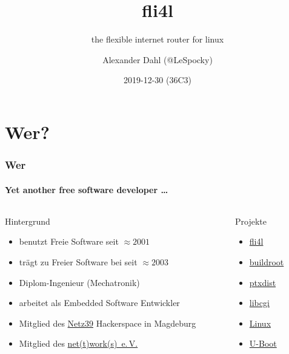 \documentclass[t]{beamer}
\title[fli4l]{fli4l}
\subtitle{the flexible internet router for linux}
\author{Alexander Dahl (@LeSpocky)}
\institute[fli4l.de]{\url{https://www.fli4l.de/}}
\date{2019-12-30 (36C3)}
\begin{document}
\begin{frame}
    \titlepage
\end{frame}


\section*{Wer?}

\begin{frame}
    \frametitle{Wer}
    \framesubtitle{Yet another free software developer \dots}

    \begin{columns}[T,onlytextwidth]
        \begin{column}{0.7\textwidth}
            \begin{block}{Hintergrund}
                \begin{itemize}
                    \item benutzt Freie Software seit $\approx 2001$
                    \item trägt zu Freier Software bei seit $\approx 2003$
                    \item Diplom-Ingenieur (Mechatronik)
                    \item arbeitet als Embedded Software Entwickler
                    \item Mitglied des \href{http://www.netz39.de/}{Netz39}
                        Hackerspace in Magdeburg
                    \item Mitglied des
                        \href{https://www.nettworks.org/}{net(t)work(s)~e.\,V.}
                \end{itemize}
            \end{block}
        \end{column}
        \begin{column}{0.3\textwidth}
            \begin{block}{Projekte}
                \begin{itemize}
                    \item \href{https://www.fli4l.de/}{fli4l}
                    \item \href{https://buildroot.org/}{buildroot}
                    \item \href{https://ptxdist.org/}{ptxdist}
                    \item \href{https://github.com/rafaelsteil/libcgi}{libcgi}
                    \item \href{https://www.kernel.org/}{Linux}
                    \item \href{https://www.denx.de/wiki/U-Boot/}{U-Boot}
                \end{itemize}
            \end{block}
        \end{column}
    \end{columns}
\end{frame}
\end{document}
